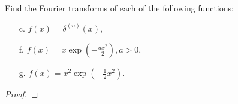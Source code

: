 \begin{problem}{2.1}
  Find the Fourier transforms of each of the following functions:
  \begin{enumerate}
    \item [c.] $f(x) = \delta ^{(n)}(x),$
    \item [f.] $\displaystyle f(x) = x \exp \left( -\frac{a x^2}{2} \right), a > 0,$
    \item [g.] $\displaystyle f(x) = x^2 \exp \left( -\frac{1}{2}x^2 \right).$
  \end{enumerate}
\end{problem}

\begin{proof}
\end{proof}
\newpage
